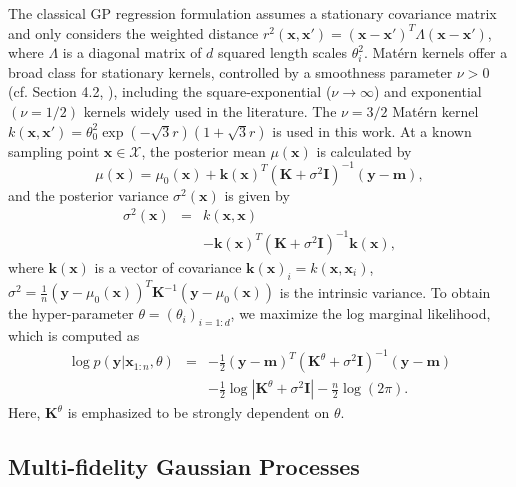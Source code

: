 \documentclass[%
 reprint,
aip,jcp
]{revtex4-1}
\begin{document}
The classical GP regression formulation assumes a stationary covariance matrix and only considers the weighted distance $r^2(\bm{x}, \bm{x'}) = (\bm{x} - \bm{x'})^T \Lambda (\bm{x} - \bm{x'})$, where $\Lambda$ is a diagonal matrix of $d$ squared length scales $\theta_i^2$. 
Mat{\'e}rn kernels offer a broad class for stationary kernels, controlled by a smoothness parameter $\nu>0$ (cf. Section 4.2, \cite{rasmussen2006gaussian}), including the square-exponential ($\nu \to \infty$) and exponential $(\nu = 1/2)$ kernels widely used in the literature. 
The $\nu = 3/2$ Mat{\'e}rn kernel $k(\bm{x}, \bm{x'}) = \theta_0^2 \exp{(-\sqrt{3}r)} (1+\sqrt{3} r)$ is used in this work. 
At a known sampling point $\bm{x} \in \mathcal{X}$, the posterior mean $\mu (\bm{x})$ is
calculated by
\begin{equation}
\label{eq:mean}
\mu(\bm{x}) = \mu_0(\bm{x}) + \bm{k}(\bm{x})^T (\bm{K} + \sigma^2 \bm{I})^{-1} (\bm{y} - \bm{m}),
\end{equation}
and the posterior variance $\sigma^2 (\bm{x})$ is given by
\begin{equation}
  \begin{array}{lll}
    \sigma^2(\bm{x}) &=& k(\bm{x}, \bm{x}) \\
    &&- \bm{k}(\bm{x})^T (\bm{K}  + \sigma^2 \bm{I})^{-1} \bm{k}(\bm{x}),
  \end{array}
\label{eq:variance}
\end{equation}
where $\bm{k}(\bm{x})$ is a vector of covariance $\bm{k}(\bm{x})_i = k(\bm{x}, \bm{x}_i)$, $\sigma^2 = \frac{1}{n} (\bm{y} - \mu_0(\bm{x}))^T \bm{K}^{-1} (\bm{y} - \mu_0(\bm{x})) $ is the intrinsic variance. 
To obtain the hyper-parameter $\theta = (\theta_i)_{i=1:d}$, we maximize the log marginal likelihood, which is computed as
\begin{equation}
\begin{array}{lll}
\log p(\bm{y} | \bm{x}_{1:n}, \theta) &=& - \frac{1}{2} (\bm{y} - \bm{m})^T (\bm{K}^{\theta} + \sigma^2 \bm{I})^{-1} (\bm{y} - \bm{m}) \\
&& - \frac{1}{2} \log{| \bm{K}^{\theta} + \sigma^2 \bm{I} |} - \frac{n}{2} \log{(2\pi)}.
\end{array}
\end{equation}
Here, $\bm{K}^{\theta}$ is emphasized to be strongly dependent on $\theta$. 

\subsection{Multi-fidelity Gaussian Processes}
\end{document}
